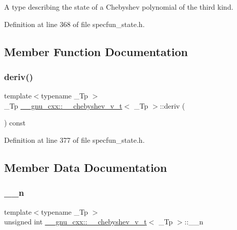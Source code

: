 A type describing the state of a Chebyshev polynomial of the third kind. 

Definition at line 368 of file specfun\+\_\+state.\+h.



\subsection{Member Function Documentation}
\mbox{\label{struct____gnu__cxx_1_1____chebyshev__v__t_a3ac7c3f4a04b5ec272f73c5dde89f218}} 
\subsubsection{\texorpdfstring{deriv()}{deriv()}}
{\footnotesize\ttfamily template$<$typename \+\_\+\+Tp $>$ \\
\+\_\+\+Tp \hyperlink{struct____gnu__cxx_1_1____chebyshev__v__t}{\+\_\+\+\_\+gnu\+\_\+cxx\+::\+\_\+\+\_\+chebyshev\+\_\+v\+\_\+t}$<$ \+\_\+\+Tp $>$\+::deriv (\begin{DoxyParamCaption}{ }\end{DoxyParamCaption}) const\hspace{0.3cm}{\ttfamily [inline]}}



Definition at line 377 of file specfun\+\_\+state.\+h.



\subsection{Member Data Documentation}
\mbox{\label{struct____gnu__cxx_1_1____chebyshev__v__t_a8981f11be84a3bc3b8a1bc7991cd75e2}} 
\subsubsection{\texorpdfstring{\+\_\+\+\_\+n}{\_\_n}}
{\footnotesize\ttfamily template$<$typename \+\_\+\+Tp $>$ \\
unsigned int \hyperlink{struct____gnu__cxx_1_1____chebyshev__v__t}{\+\_\+\+\_\+gnu\+\_\+cxx\+::\+\_\+\+\_\+chebyshev\+\_\+v\+\_\+t}$<$ \+\_\+\+Tp $>$\+::\+\_\+\+\_\+n}



